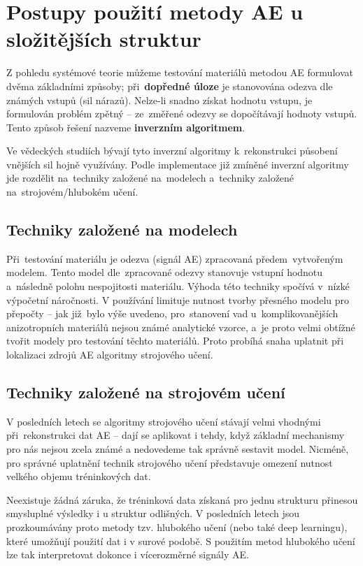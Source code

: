 \section{Postupy použití metody AE u složitějších struktur}%
Z pohledu systémové teorie můžeme testování materiálů metodou AE formulovat dvěma základními způsoby; při~\textbf{dopředné úloze} je stanovována odezva dle známých vstupů (sil nárazů). Nelze-li snadno získat hodnotu vstupu, je formulován problém zpětný – ze~změřené odezvy se dopočítávají hodnoty vstupů. Tento způsob řešení nazveme \textbf{inverzním algoritmem}.

Ve vědeckých studiích bývají tyto inverzní algoritmy k~rekonstrukci působení vnějších sil hojně využívány. Podle implementace již zmíněné inverzní algoritmy jde rozdělit na~techniky založené na~modelech a~techniky založené na~strojovém/hlubokém učení.
\subsection{Techniky založené na modelech}
Při~testování materiálu je odezva (signál AE) zpracovaná předem~vytvořeným modelem. Tento model dle~zpracované odezvy stanovuje vstupní hodnotu a~následně polohu nespojitosti materiálu. Výhoda této techniky spočívá v~nízké výpočetní náročnosti. V používání limituje nutnost tvorby přesného modelu pro přepočty – jak již~bylo výše uvedeno, pro~stanovení vad u~komplikovanějších anizotropních materiálů nejsou známé analytické vzorce, a~je proto velmi obtížné tvořit modely pro testování těchto materiálů. Proto probíhá snaha uplatnit při lokalizaci zdrojů \ac{AE} algoritmy strojového učení.
\subsection{Techniky založené na strojovém učení}
V posledních letech se algoritmy strojového učení stávají velmi vhodnými při~rekonstrukci dat AE – dají se aplikovat i tehdy, když základní mechanismy pro nás nejsou zcela známé a nedovedeme tak správně sestavit model. Nicméně, pro správné uplatnění technik strojového učení představuje omezení nutnost velkého objemu tréninkových dat. 

Neexistuje žádná záruka, že tréninková data získaná pro jednu strukturu přinesou smysluplné výsledky i u struktur odlišných. V posledních letech jsou prozkoumávány proto metody tzv. hlubokého učení (nebo také deep learningu), které umožňují použití dat i v surové podobě. S použitím metod hlubokého učení lze tak interpretovat dokonce i vícerozměrné signály \ac{AE}.

